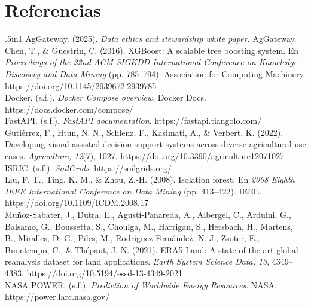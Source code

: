 \documentclass[12pt,letterpaper,oneside]{report}
\begin{document}
\chapter*{Referencias}

\begin{hangparas}{.5in}{1}
AgGateway. (2025). \textit{Data ethics and stewardship white paper}. AgGateway.\\

Chen, T., \& Guestrin, C. (2016). XGBoost: A scalable tree boosting system. En \textit{Proceedings of the 22nd ACM SIGKDD International Conference on Knowledge Discovery and Data Mining} (pp. 785--794). Association for Computing Machinery. https://doi.org/10.1145/2939672.2939785\\

Docker. (s.f.). \textit{Docker Compose overview}. Docker Docs. https://docs.docker.com/compose/\\

FastAPI. (s.f.). \textit{FastAPI documentation}. https://fastapi.tiangolo.com/\\

Gutiérrez, F., Htun, N. N., Schlenz, F., Kasimati, A., \& Verbert, K. (2022). Developing visual-assisted decision support systems across diverse agricultural use cases. \textit{Agriculture, 12}(7), 1027. https://doi.org/10.3390/agriculture12071027\\

ISRIC. (s.f.). \textit{SoilGrids}. https://soilgrids.org/\\

Liu, F. T., Ting, K. M., \& Zhou, Z.-H. (2008). Isolation forest. En \textit{2008 Eighth IEEE International Conference on Data Mining} (pp. 413--422). IEEE. https://doi.org/10.1109/ICDM.2008.17\\

Muñoz-Sabater, J., Dutra, E., Agustí-Panareda, A., Albergel, C., Arduini, G., Balsamo, G., Boussetta, S., Choulga, M., Harrigan, S., Hersbach, H., Martens, B., Miralles, D. G., Piles, M., Rodríguez-Fernández, N. J., Zsoter, E., Buontempo, C., \& Thépaut, J.-N. (2021). ERA5-Land: A state-of-the-art global reanalysis dataset for land applications. \textit{Earth System Science Data, 13}, 4349--4383. https://doi.org/10.5194/essd-13-4349-2021\\

NASA POWER. (s.f.). \textit{Prediction of Worldwide Energy Resources}. NASA. https://power.larc.nasa.gov/\\


\end{hangparas}
\end{document}
